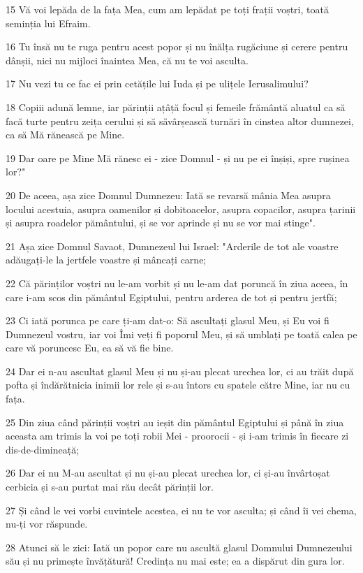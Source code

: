 \par 15 Vă voi lepăda de la fața Mea, cum am lepădat pe toți frații voștri, toată seminția lui Efraim.
\par 16 Tu însă nu te ruga pentru acest popor și nu înălța rugăciune și cerere pentru dânșii, nici nu mijloci înaintea Mea, că nu te voi asculta.
\par 17 Nu vezi tu ce fac ei prin cetățile lui Iuda și pe ulițele Ierusalimului?
\par 18 Copiii adună lemne, iar părinții ațâță focul și femeile frământă aluatul ca să facă turte pentru zeița cerului și să săvârșească turnări în cinstea altor dumnezei, ca să Mă rănească pe Mine.
\par 19 Dar oare pe Mine Mă rănesc ei - zice Domnul - și nu pe ei înșiși, spre rușinea lor?"
\par 20 De aceea, așa zice Domnul Dumnezeu: Iată se revarsă mânia Mea asupra locului acestuia, asupra oamenilor și dobitoacelor, asupra copacilor, asupra țarinii și asupra roadelor pământului, și se vor aprinde și nu se vor mai stinge".
\par 21 Așa zice Domnul Savaot, Dumnezeul lui Israel: "Arderile de tot ale voastre adăugați-le la jertfele voastre și mâncați carne;
\par 22 Că părinților voștri nu le-am vorbit și nu le-am dat poruncă în ziua aceea, în care i-am scos din pământul Egiptului, pentru arderea de tot și pentru jertfă;
\par 23 Ci iată porunca pe care ți-am dat-o: Să ascultați glasul Meu, și Eu voi fi Dumnezeul vostru, iar voi Îmi veți fi poporul Meu, și să umblați pe toată calea pe care vă poruncesc Eu, ea să vă fie bine.
\par 24 Dar ei n-au ascultat glasul Meu și nu și-au plecat urechea lor, ci au trăit după pofta și îndărătnicia inimii lor rele și s-au întors cu spatele către Mine, iar nu cu fața.
\par 25 Din ziua când părinții voștri au ieșit din pământul Egiptului și până în ziua aceasta am trimis la voi pe toți robii Mei - proorocii - și i-am trimis în fiecare zi dis-de-dimineață;
\par 26 Dar ei nu M-au ascultat și nu și-au plecat urechea lor, ci și-au învârtoșat cerbicia și s-au purtat mai rău decât părinții lor.
\par 27 Și când le vei vorbi cuvintele acestea, ei nu te vor asculta; și când îi vei chema, nu-ți vor răspunde.
\par 28 Atunci să le zici: Iată un popor care nu ascultă glasul Domnului Dumnezeului său și nu primește învățătură! Credința nu mai este; ea a dispărut din gura lor.
